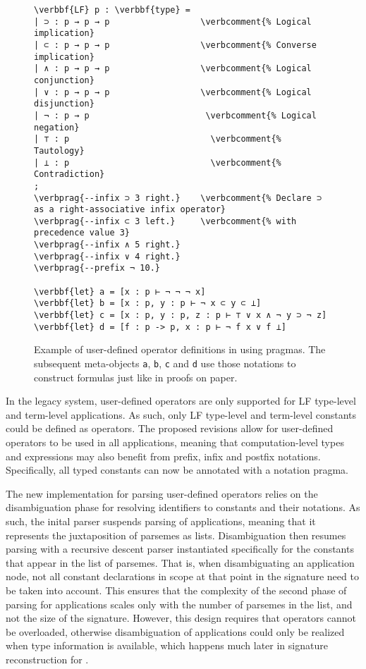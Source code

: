 \begin{figure}[!htb]
\begin{Verbatim}[commandchars=\\\{\}]
\verbbf{LF} p : \verbbf{type} =
| ⊃ : p → p → p                  \verbcomment{% Logical implication}
| ⊂ : p → p → p                  \verbcomment{% Converse implication}
| ∧ : p → p → p                  \verbcomment{% Logical conjunction}
| ∨ : p → p → p                  \verbcomment{% Logical disjunction}
| ¬ : p → p                       \verbcomment{% Logical negation}
| ⊤ : p                            \verbcomment{% Tautology}
| ⊥ : p                            \verbcomment{% Contradiction}
;
\verbprag{--infix ⊃ 3 right.}    \verbcomment{% Declare ⊃ as a right-associative infix operator}
\verbprag{--infix ⊂ 3 left.}     \verbcomment{% with precedence value 3}
\verbprag{--infix ∧ 5 right.}
\verbprag{--infix ∨ 4 right.}
\verbprag{--prefix ¬ 10.}

\verbbf{let} a = [x : p ⊢ ¬ ¬ ¬ x]
\verbbf{let} b = [x : p, y : p ⊢ ¬ x ⊂ y ⊂ ⊥]
\verbbf{let} c = [x : p, y : p, z : p ⊢ ⊤ ∨ x ∧ ¬ y ⊃ ¬ z]
\verbbf{let} d = [f : p -> p, x : p ⊢ ¬ f x ∨ f ⊥]
\end{Verbatim}
\caption[Example of user-defined operator definitions in \Beluga using pragmas.]{%
Example of user-defined operator definitions in \Beluga using pragmas.
The subsequent meta-objects \texttt{a}, \texttt{b}, \texttt{c} and \texttt{d} use those notations to construct formulas just like in proofs on paper.
}
\label{figure:operator-pragmas}
\end{figure}

In the legacy \Beluga system, user-defined operators are only supported for \ac{LF} type-level and term-level applications.
As such, only \ac{LF} type-level and term-level constants could be defined as operators.
The proposed revisions allow for user-defined operators to be used in all applications, meaning that computation-level types and expressions may also benefit from prefix, infix and postfix notations.
Specifically, all typed constants can now be annotated with a notation pragma.

The new implementation for parsing user-defined operators relies on the disambiguation phase for resolving identifiers to constants and their notations.
As such, the inital parser suspends parsing of applications, meaning that it represents the juxtaposition of parsemes as lists.
Disambiguation then resumes parsing with a recursive descent parser instantiated specifically for the constants that appear in the list of parsemes.
That is, when disambiguating an application node, not all constant declarations in scope at that point in the \Beluga signature need to be taken into account.
This ensures that the complexity of the second phase of parsing for applications scales only with the number of parsemes in the list, and not the size of the signature.
However, this design requires that operators cannot be overloaded, otherwise disambiguation of applications could only be realized when type information is available, which happens much later in signature reconstruction for \Beluga.


